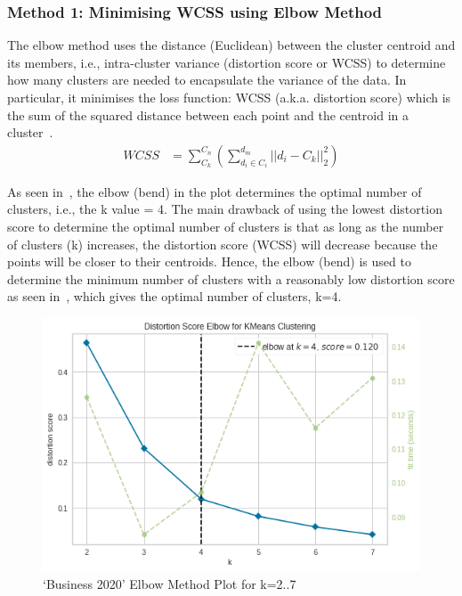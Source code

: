 \subsubsection{Method 1: Minimising WCSS using Elbow Method}
The elbow method uses the distance (Euclidean) between the cluster centroid and its members, i.e., intra-cluster variance (distortion score or WCSS) to determine how many clusters are needed to encapsulate the variance of the data. In particular, it minimises the loss function: WCSS (a.k.a. distortion score) which is the sum of the squared distance between each point and the centroid in a cluster~\cite{elbowvssil}.
\vspace{-1ex}
\begin{align}
  \mathit{WCSS} &=  \sum^{C_n}_{C_k} (\sum^{d_m}_{d_i \in C_i} || d_i - C_k ||_2^2) \label{eq:wcss}
\end{align}

As seen in~, the elbow (bend) in the plot determines the optimal number of clusters, i.e., the k value = 4. The main drawback of using the lowest distortion score to determine the optimal number of clusters is that as long as the number of clusters (k) increases, the distortion score (WCSS) will decrease because the points will be closer to their centroids. Hence, the elbow (bend) is used to determine the minimum number of clusters with a reasonably low distortion score as seen in~, which gives the optimal number of clusters, k=4.

\begin{figure}[H]
\centering
\includegraphics[scale=0.4]{images/elbow.png}
\caption{`Business 2020' Elbow Method Plot for k=2..7}
\label{fig:elbow}
\end{figure}

